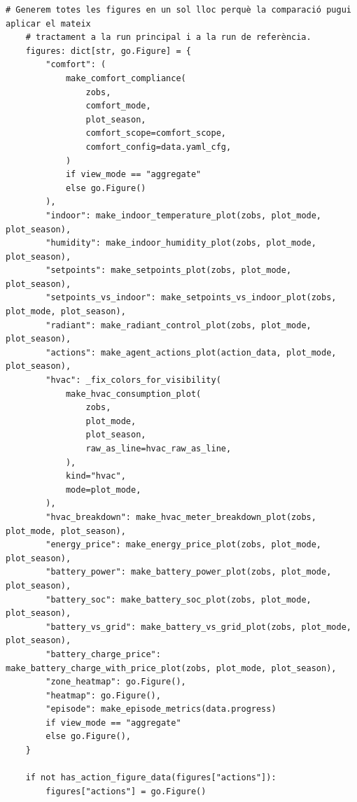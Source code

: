 \documentclass[10pt,a4paper]{article}
\begin{document}
\begin{lstlisting}[style=studioPython,caption={page\_components/resultats\_dashboard.py},label={lst:page-components-resultats-dashboard-py}]
    # Generem totes les figures en un sol lloc perquè la comparació pugui aplicar el mateix
    # tractament a la run principal i a la run de referència.
    figures: dict[str, go.Figure] = {
        "comfort": (
            make_comfort_compliance(
                zobs,
                comfort_mode,
                plot_season,
                comfort_scope=comfort_scope,
                comfort_config=data.yaml_cfg,
            )
            if view_mode == "aggregate"
            else go.Figure()
        ),
        "indoor": make_indoor_temperature_plot(zobs, plot_mode, plot_season),
        "humidity": make_indoor_humidity_plot(zobs, plot_mode, plot_season),
        "setpoints": make_setpoints_plot(zobs, plot_mode, plot_season),
        "setpoints_vs_indoor": make_setpoints_vs_indoor_plot(zobs, plot_mode, plot_season),
        "radiant": make_radiant_control_plot(zobs, plot_mode, plot_season),
        "actions": make_agent_actions_plot(action_data, plot_mode, plot_season),
        "hvac": _fix_colors_for_visibility(
            make_hvac_consumption_plot(
                zobs,
                plot_mode,
                plot_season,
                raw_as_line=hvac_raw_as_line,
            ),
            kind="hvac",
            mode=plot_mode,
        ),
        "hvac_breakdown": make_hvac_meter_breakdown_plot(zobs, plot_mode, plot_season),
        "energy_price": make_energy_price_plot(zobs, plot_mode, plot_season),
        "battery_power": make_battery_power_plot(zobs, plot_mode, plot_season),
        "battery_soc": make_battery_soc_plot(zobs, plot_mode, plot_season),
        "battery_vs_grid": make_battery_vs_grid_plot(zobs, plot_mode, plot_season),
        "battery_charge_price": make_battery_charge_with_price_plot(zobs, plot_mode, plot_season),
        "zone_heatmap": go.Figure(),
        "heatmap": go.Figure(),
        "episode": make_episode_metrics(data.progress)
        if view_mode == "aggregate"
        else go.Figure(),
    }

    if not has_action_figure_data(figures["actions"]):
        figures["actions"] = go.Figure()


\end{lstlisting}
\end{document}
